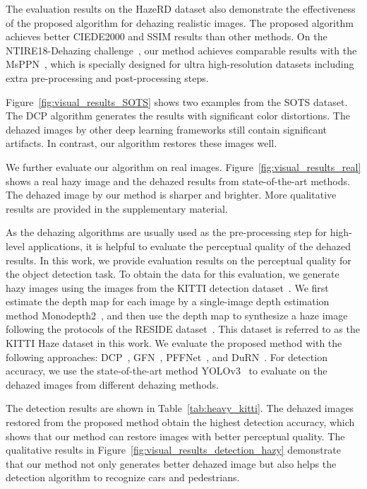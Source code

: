 \documentclass[10pt,twocolumn,letterpaper]{article}
\newcommand{\figref}[1]{Figure~\ref{fig:#1}}
\newcommand{\tabref}[1]{Table~\ref{tab:#1}}
\begin{document}
  The evaluation results on the HazeRD dataset also demonstrate the effectiveness of the proposed algorithm for dehazing realistic images.
The proposed algorithm achieves better CIEDE2000 and SSIM results than other methods.
On the NTIRE18-Dehazing challenge~\cite{NTIRE2018}, our method achieves comparable results with the MsPPN~\cite{MsPPN},
  which is specially designed for ultra high-resolution datasets including extra pre-processing and post-processing steps.


  \figref{visual_results_SOTS} shows two examples from the SOTS dataset. The DCP algorithm generates the results with significant color distortions.
The dehazed images by other deep learning frameworks still contain significant artifacts.
In contrast, our algorithm restores these images well.
  
  We further evaluate our algorithm on real images.
\figref{visual_results_real} shows a real hazy image and the dehazed results from state-of-the-art methods.
The dehazed image by our method is sharper and brighter.
More qualitative results are provided in the supplementary material.
  
As the dehazing algorithms are usually used as the pre-processing step for high-level applications, it is helpful to evaluate the perceptual quality of the dehazed results.
In this work, we provide evaluation results on the perceptual quality for the object detection task.
To obtain the data for this evaluation, we generate hazy images using the images from the KITTI detection dataset~\cite{kitti_detection}.
We first estimate the depth map for each image by a single-image depth estimation method Monodepth2~\cite{monodepth2}, and then use the depth map to synthesize a haze image following the protocols of the RESIDE dataset~\cite{RESIDE}.
This dataset is referred to as the KITTI Haze dataset in this work.
We evaluate the proposed method with the following approaches: DCP~\cite{He_dark}, GFN~\cite{GFN}, PFFNet~\cite{PFFNet}, and DuRN~\cite{DuRN}.
For detection accuracy, we use the state-of-the-art method YOLOv3~\cite{yolov3} to evaluate on the dehazed images from different dehazing methods.
  
  The detection results are shown in \tabref{heavy_kitti}.
The dehazed images restored from the proposed method obtain the highest detection accuracy, which shows that our method can restore images with better perceptual quality.
The qualitative results in \figref{visual_results_detection_hazy} demonstrate
  that our method not only generates better dehazed image but also helps the detection algorithm to recognize cars and pedestrians.
  
\end{document}
